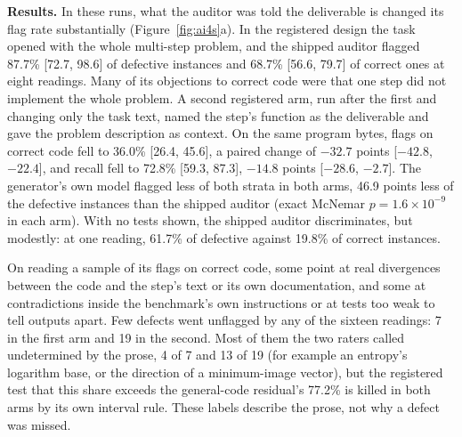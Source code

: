 \textbf{Results.} In these runs, what the auditor was told the deliverable is changed its flag rate
substantially (Figure~\ref{fig:ai4s}a). In the registered design the task
opened with the whole multi-step problem, and the shipped auditor flagged 87.7\% [72.7, 98.6] of
defective instances and 68.7\% [56.6, 79.7] of correct ones at eight readings. Many of its
objections to correct code were that one step did not implement the whole problem. A second
registered arm, run after the first and changing only the task text, named the step's function as
the deliverable and gave the problem description as context. On the same program bytes, flags on
correct code fell to 36.0\% [26.4, 45.6], a paired change of $-32.7$ points [$-42.8$, $-22.4$], and
recall fell to 72.8\% [59.3, 87.3], $-14.8$ points [$-28.6$, $-2.7$]. The generator's own model flagged
less of both strata in both arms, 46.9 points less of the defective instances than the shipped
auditor (exact McNemar $p = 1.6\times10^{-9}$ in each arm). With no tests shown, the shipped auditor
discriminates, but modestly: at one reading, 61.7\% of defective against 19.8\% of correct instances.

On reading a sample of its flags on correct code, some point at real divergences between the code
and the step's text or its own documentation, and some at contradictions inside the benchmark's own
instructions or at tests too weak to tell outputs apart. Few defects went unflagged by any of the
sixteen readings: 7 in the first arm and 19 in the second. Most of them the two raters called
undetermined by the prose, 4 of 7 and 13 of 19 (for example an entropy's logarithm base, or the
direction of a minimum-image vector), but the registered test that this share exceeds the general-code
residual's 77.2\% is killed in both arms by its own interval rule. These labels describe the prose,
not why a defect was missed.
